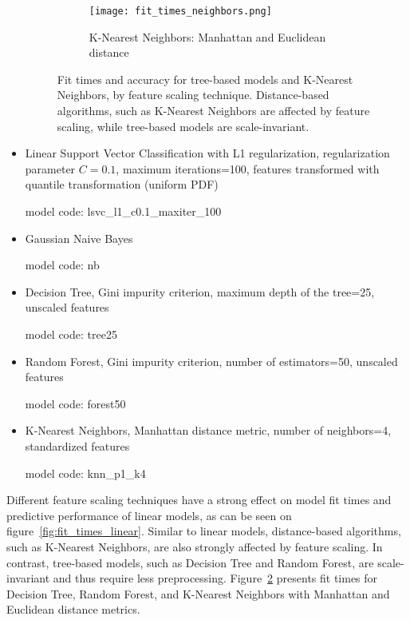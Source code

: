 \begin{itemize}
\begin{figure}[ht]
        \begin{subfigure}{\linewidth}
            \centering
            \texttt{[image: fit\_times\_neighbors.png]}
            \label{fig:fit_times_neighbors}
            \caption{K-Nearest Neighbors: Manhattan and Euclidean distance}
        \end{subfigure}
        \caption{Fit times and accuracy for tree-based models and K-Nearest Neighbors, by feature scaling technique.
        Distance-based algorithms, such as K-Nearest Neighbors are affected by feature scaling, while tree-based models are scale-invariant.}
        \label{fig:fit_times_trees_neighbors}
    \end{figure}

    \item Linear Support Vector Classification with L1 regularization, regularization parameter $C=0.1$, maximum iterations=100, features transformed with quantile transformation (uniform PDF)

    model code: lsvc\_l1\_c0.1\_maxiter\_100

    \item Gaussian Naive Bayes

    model code: nb

    \item Decision Tree, Gini impurity criterion, maximum depth of the tree=25, unscaled features

    model code: tree25

    \item Random Forest, Gini impurity criterion, number of estimators=50, unscaled features

    model code: forest50

    \item K-Nearest Neighbors, Manhattan distance metric, number of neighbors=4, standardized features

    model code: knn\_p1\_k4

\end{itemize}

Different feature scaling techniques have a strong effect on model fit times and predictive performance of linear models, as can be seen on figure~\ref{fig:fit_times_linear}.
Similar to linear models, distance-based algorithms, such as K-Nearest Neighbors, are also strongly affected by feature scaling.
In contrast, tree-based models, such as Decision Tree and Random Forest, are scale-invariant and thus require less preprocessing.
Figure~\ref{fig:fit_times_trees_neighbors} presents fit times for Decision Tree, Random Forest, and K-Nearest Neighbors with Manhattan and Euclidean distance metrics.

